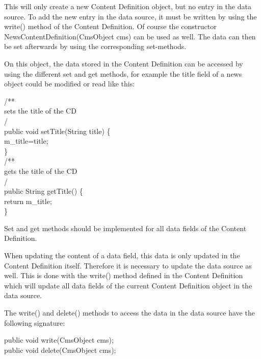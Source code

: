 This will only create a new Content Definition object, but no entry in
the data source. To add the new entry in the data source, it must be
written by using the {\meth write(}) method of the Content Definition.
Of course the constructor NewsContentDefinition(CmsObject cms) can be
used as well. The data can then be set afterwards by using the
corresponding set-methods. 

On this object, the data stored in the Content Definition can be
accessed by using the different set and get methods, for example the
title field of a news object could be modified or read like this:

\begin{java}
\jtaba          /**\\
\jtaba   \xspace * sets the title of the CD\\
\jtaba   \xspace */\\
\jtaba public void setTitle(String title) \{\\
\jtabb        m\_title=title;\\
\jtaba \}\\[1ex]

\jtaba         /**\\
\jtaba  \xspace * gets the title of the CD\\
\jtaba  \xspace */\\
\jtaba public String getTitle() \{\\
\jtabb        return m\_title;\\
\jtaba \}\\
\end{java}

Set and get methods should be implemented for all data fields of the
Content Definition.

When updating the content of a data field, this data is only updated in
the Content Definition itself. Therefore it is necessary to update the
data source as well. This is done with the {\meth write()} method defined in the
Content Definition which will update all data fields of the current
Content Definition object in the data source.

The {\meth write()} and {\meth delete()} methods to access the data in the
data source have the following signature:
\begin{java}
\jtaba public void write(CmsObject cms);\\[1ex]
\jtaba public void delete(CmsObject cms);\\
\end{java}

